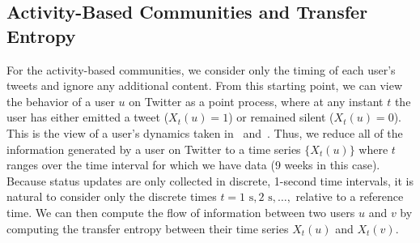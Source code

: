 \subsection{Activity-Based Communities and Transfer Entropy}
\label{sec:method-activity}

For the activity-based communities, we consider only the timing of each user's tweets and ignore any additional content. From this starting point, we can view the behavior of a user $u$ on Twitter as a point process, where at any instant $t$ the user has either emitted a tweet ($X_{t}(u) = 1$) or remained silent ($X_{t}(u) = 0$). This is the view of a user's dynamics taken in~\cite{ver2012information} and~\cite{darmon2013understanding}. Thus, we reduce all of the information generated by a user on Twitter to a time series $\{ X_{t}(u)\}$ where $t$ ranges over the time interval for which we have data (9 weeks in this case). Because status updates are only collected in discrete, 1-second time intervals, it is natural to consider only the discrete times $t = 1 \text{ s}, 2 \text{ s}, \ldots, $ relative to a reference time. We can then compute the flow of information between two users $u$ and $v$ by computing the transfer entropy between their time series $X_{t}(u)$ and $X_{t}(v).$

